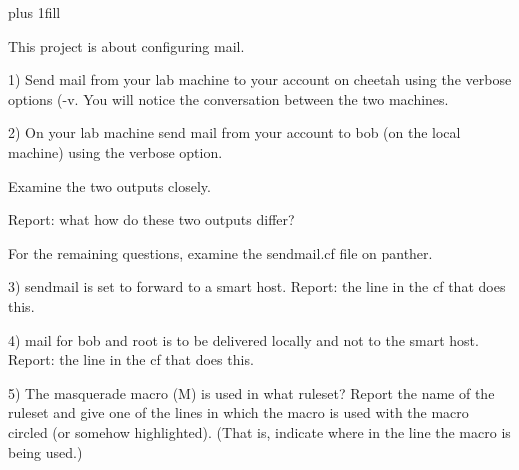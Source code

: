 
\rightskip=0pt plus 1fill

\parindent 0pt

This project is about configuring mail.

1) Send mail from your lab machine to your account on {\ltt{}cheetah}
using the verbose options ({\ltt{}-v}.
You will notice the conversation between the two machines.

2) On your lab machine send mail from your account to bob (on the
local machine) using the verbose option.

Examine the two outputs closely.

Report: what how do these two outputs differ?

For the remaining questions, examine the {\ltt{}sendmail.cf}
file on {\ltt{}panther}.

3) sendmail is set to forward to a smart host.
Report: the line in the {\ltt{}cf} that does this.

4) mail for bob and root is to be delivered locally and not to the
smart host.
Report: the line in the {\ltt{}cf} that does this.

5) The masquerade macro ({\ltt{}M}) is used in what ruleset?
Report the name of the ruleset and give one of the lines
in which the macro is used with the macro circled (or
somehow highlighted).
(That is, indicate where in the line the macro is being used.)
\bye
